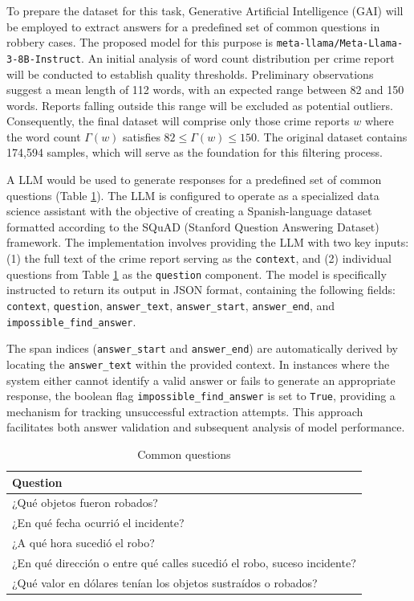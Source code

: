 \documentclass[onecolumn, journal, english, 12pt, a4paper]{IEEEtran} %
\theoremstyle{definition}
\begin{document}
To prepare the dataset for this task, Generative Artificial
Intelligence (GAI) will be employed to extract answers for a
predefined set of common questions in robbery cases. The proposed
model for this purpose is
\texttt{meta-llama/Meta-Llama-3-8B-Instruct}. An initial analysis of
word count distribution per crime report will be conducted to
establish quality thresholds. Preliminary observations suggest a mean
length of 112 words, with an expected range between 82 and 150
words. Reports falling outside this range will be excluded as
potential outliers. Consequently, the final dataset will comprise only
those crime reports \(w\) where the word count \(\Gamma(w)\) satisfies
\(82 \leq \Gamma(w) \leq 150\). The original dataset contains 174,594
samples, which will serve as the foundation for this filtering
process.

A LLM would be used to generate responses for a predefined set of
common questions (Table \ref{tab:org640ecfb}). The LLM is configured
to operate as a specialized data science assistant with the objective
of creating a Spanish-language dataset formatted according to the
SQuAD (Stanford Question Answering Dataset) framework. The
implementation involves providing the LLM with two key inputs: (1) the
full text of the crime report serving as the \texttt{context}, and (2)
individual questions from Table \ref{tab:org640ecfb} as the
\texttt{question} component. The model is specifically instructed to
return its output in JSON format, containing the following fields:
\texttt{context}, \texttt{question}, \texttt{answer\_text},
\texttt{answer\_start}, \texttt{answer\_end}, and
\texttt{impossible\_find\_answer}.

The span indices (\texttt{answer\_start} and \texttt{answer\_end}) are
automatically derived by locating the \texttt{answer\_text} within the
provided context. In instances where the system either cannot identify
a valid answer or fails to generate an appropriate response, the
boolean flag \texttt{impossible\_find\_answer} is set to
\texttt{True}, providing a mechanism for tracking unsuccessful
extraction attempts. This approach facilitates both answer validation
and subsequent analysis of model performance.

\begin{table}[htbp]
\caption{\label{tab:org640ecfb}Common questions}
\centering
\begin{tabular}{l}
\hline
Question\\
\hline
¿Qué objetos fueron robados?\\
¿En qué fecha ocurrió el incidente?\\
¿A qué hora sucedió el robo?\\
¿En qué dirección o entre qué calles sucedió el robo, suceso incidente?\\
¿Qué valor en dólares tenían los objetos sustraídos o robados?\\
\hline
\end{tabular}
\end{table}
\end{document}

